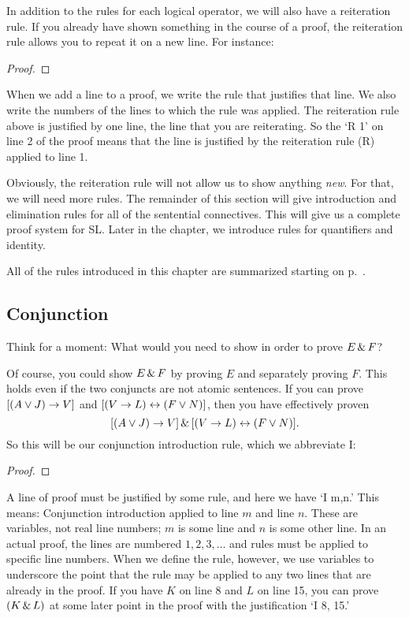 In addition to the rules for each logical operator, we will also have a reiteration rule. If you already have shown something in the course of a proof, the reiteration rule allows you to repeat it on a new line. For instance:

\begin{proof}
	 
\end{proof}

When we add a line to a proof, we write the rule that justifies that line. We also write the numbers of the lines to which the rule was applied. The reiteration rule above is justified by one line, the line that you are reiterating. So the `R 1' on line 2 of the proof means that the line is justified by the reiteration rule (R) applied to line 1.

Obviously, the reiteration rule will not allow us to show anything \emph{new}. For that, we will need more rules. The remainder of this section will give introduction and elimination rules for all of the sentential connectives. This will give us a complete proof system for SL. Later in the chapter, we introduce rules for quantifiers and identity.

All of the rules introduced in this chapter are summarized starting on p.~\pageref{ProofRules}.


\subsection{Conjunction}

Think for a moment: What would you need to show in order to prove $E \,\&\, F$?

Of course, you could show $E \,\&\, F$ by proving $E$ and separately proving $F$. 
This holds even if the two conjuncts are not atomic sentences. If you can prove $[(A \vee J) \rightarrow V]$ and  $[(V \rightarrow L) \leftrightarrow (F \vee N)]$, then you have effectively proven
$$[(A \vee J) \rightarrow V] \,\&\, [(V \rightarrow L) \leftrightarrow (F \vee N)].$$
So this will be our conjunction introduction rule, which we abbreviate {\eand}I:

\begin{proof}
	 
\end{proof}

A line of proof must be justified by some rule, and here we have `{\eand}I m,n.' This means: Conjunction introduction applied to line $m$ and line $n$. These are variables, not real line numbers; $m$ is some line and $n$ is some other line. In an actual proof, the lines are numbered $1, 2, 3, \ldots$ and rules must be applied to specific line numbers. When we define the rule, however, we use variables to underscore the point that the rule may be applied to any two lines that are already in the proof. If you have $K$ on line 8 and $L$ on line 15, you can prove $(K\,\&\, L)$ at some later point in the proof with the justification `{\eand}I 8, 15.'

